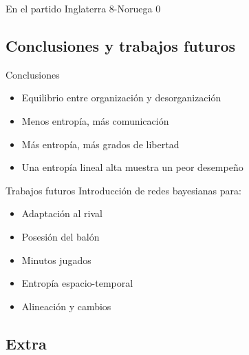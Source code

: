 \documentclass{beamer}
\begin{document}
\begin{frame}{En el partido Inglaterra 8-Noruega 0}
	\begin{figure}
		\centering
		\end{figure}
\end{frame}

%
\subsection{Conclusiones y trabajos futuros}

\begin{frame}{Conclusiones}
	\begin{itemize}
		\item Equilibrio entre organización y desorganización
		\item Menos entropía, más comunicación
		\item Más entropía, más grados de libertad 
		\item Una entropía lineal alta muestra un peor desempeño
	\end{itemize}
\end{frame}

\begin{frame}{Trabajos futuros}
	Introducción de redes bayesianas para:
	\begin{itemize}
		\item Adaptación al rival
		\item Posesión del balón
		\item Minutos jugados
		\item Entropía espacio-temporal
		\item Alineación y cambios
	\end{itemize}
\end{frame}

\subsection{Extra}
\end{document}
